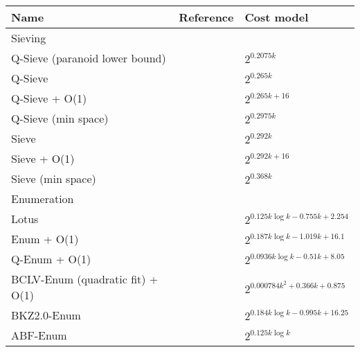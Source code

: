 \begin{table}
  \centering
  \begin{tabular}{lll}
    \toprule
    Name                             & Reference                       & Cost model                            \\\hline
    Sieving                          &                                 &                                       \\\hline
    Q-Sieve (paranoid lower bound)   & \cite{ADPS16}                   & $2^{0.2075k}$                         \\
    Q-Sieve                          & \cite{Laa15,ADPS16,AGPS20}      & $2^{0.265k}$                          \\
    Q-Sieve + O(1)                   & \cite{SAL+17}                   & $2^{0.265k + 16}$                     \\
    Q-Sieve (min space)              & \cite{SHRS17}                   & $2^{0.2975k}$                         \\
    Sieve                            & \cite{BDGL16,ADPS16,AGPS20}     & $2^{0.292k}$                          \\
    Sieve + O(1)                     & \cite{SAL+17}                   & $2^{0.292k + 16}$                     \\
    Sieve (min space)                & \cite{SHRS17}                   & $2^{0.368k}$                          \\\hline
    Enumeration                      &                                 &                                       \\\hline
    Lotus                            & \cite{PHAM17, ACDDPPVW18}       & $2^{0.125k \log k - 0.755 k + 2.254}$ \\
    Enum + O(1)                      & \cite{SHRS17,Chen13,ACDDPPVW18} & $2^{0.187k \log k - 1.019 k + 16.1}$  \\
    Q-Enum + O(1)                    & \cite{SHRS17,Chen13,ACDDPPVW18} & $2^{0.0936k \log k - 0.51 k + 8.05}$  \\
    BCLV-Enum (quadratic fit) + O(1) & \cite{BCLV17}                   & $2^{0.000784 k^2 + 0.366 k + 0.875}$  \\
    BKZ2.0-Enum                      & \cite{CN11, Chen13, ABFKSW20}   & $2^{0.184k \log k - 0.995k + 16.25}$  \\
    ABF-Enum                         & \cite{ABFKSW20}                 & $2^{0.125k \log k}$                   \\

\end{tabular}
\end{table}
